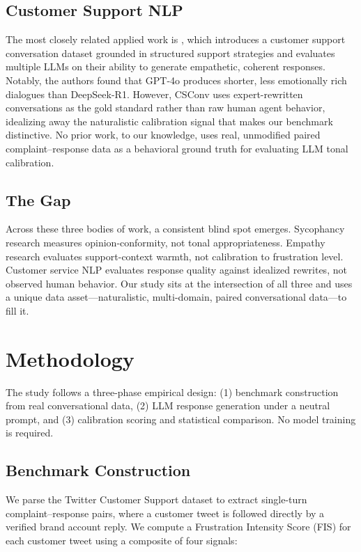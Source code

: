 \documentclass[11pt]{article}
\begin{document}
\subsection{Customer Support NLP}

The most closely related applied work is \citet{csconv2025}, which introduces a customer support conversation dataset grounded in structured support strategies and evaluates multiple LLMs on their ability to generate empathetic, coherent responses. Notably, the authors found that GPT-4o produces shorter, less emotionally rich dialogues than DeepSeek-R1. However, CSConv uses expert-rewritten conversations as the gold standard rather than raw human agent behavior, idealizing away the naturalistic calibration signal that makes our benchmark distinctive. No prior work, to our knowledge, uses real, unmodified paired complaint--response data as a behavioral ground truth for evaluating LLM tonal calibration.

\subsection{The Gap}

Across these three bodies of work, a consistent blind spot emerges. Sycophancy research measures opinion-conformity, not tonal appropriateness. Empathy research evaluates support-context warmth, not calibration to frustration level. Customer service NLP evaluates response quality against idealized rewrites, not observed human behavior. Our study sits at the intersection of all three and uses a unique data asset---naturalistic, multi-domain, paired conversational data---to fill it.



\section{Methodology}
The study follows a three-phase empirical design: (1) benchmark construction from real conversational data, (2) LLM response generation under a neutral prompt, and (3) calibration scoring and statistical comparison. No model training is required.

\subsection{Benchmark Construction}

We parse the Twitter Customer Support dataset \cite{stuart_axelbrooke_2017} to extract single-turn complaint--response pairs, where a customer tweet is followed directly by a verified brand account reply. We compute a Frustration Intensity Score (FIS) for each customer tweet using a composite of four signals:
\end{document}

